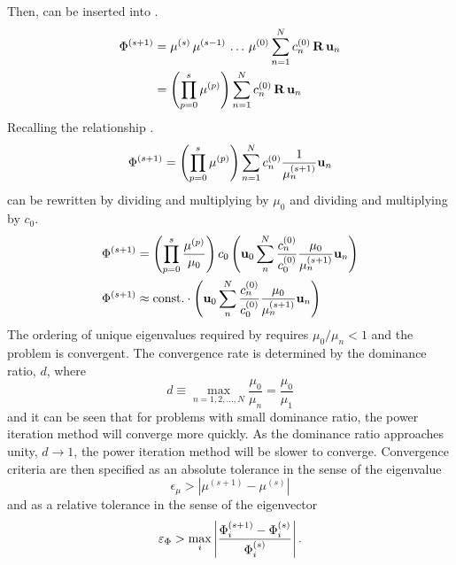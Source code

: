     Then,  can be inserted into
    .
    \begin{align}
      \Phi^{(s+1)} &= \mu^{(s)} \, \mu^{(s-1)} \, \ldots \, 
        \mu^{(0)} \sum_{n=1}^N c_n^{(0)} \, \mathbf{R} \, \mathbf{u}_n \\
      &= \left( \prod_{p=0}^{s} \mu^{(p)} \right) \sum_{n=1}^N c_n^{(0)} \, 
        \mathbf{R} \, \mathbf{u}_n
    \end{align}
    Recalling the relationship .
    \begin{equation}
      \label{eq:phi_expand_above}
      \Phi^{(s+1)} = \left( \prod_{p=0}^s \mu^{(p)} \right) 
        \sum_{n=1}^N c_n^{(0)} \frac{1}{\mu_n^{(s+1)}} \mathbf{u}_n
    \end{equation}
     can be rewritten by dividing and multiplying by
    $\mu_0$ and dividing and multiplying by $c_0$.
    \begin{align}
      \Phi^{(s+1)} &= \left( \prod_{p=0}^s \frac{\mu^{(p)}}{\mu_0} 
        \right) c_0 \left( \mathbf{u}_0 \sum_n^N \frac{c_n^{(0)}}{c_0^{(0)}}
        \frac{\mu_0}{\mu_n^{(s+1)}} \mathbf{u}_n \right) \\
      \label{eq:eigen_phi_converge}
      \Phi^{(s+1)} &\approx \text{const.} \cdot \left( 
        \mathbf{u}_0 \sum_n^N \frac{c_n^{(0)}}{c_0^{(0)}}
        \frac{\mu_0}{\mu_n^{(s+1)}} \mathbf{u}_n \right)
    \end{align}
    The ordering of unique eigenvalues required by  
    requires $\mu_0 / \mu_n < 1$ and the problem is convergent. The 
    convergence rate is determined by the dominance ratio, $d$, where
    \begin{equation}
      \label{eq:dominance_ratio}
      d \equiv \max_{n=1,2,\ldots,N} \frac{\mu_0}{\mu_n} =
        \frac{\mu_0}{\mu_1}
    \end{equation}
    and it can be seen that for problems with small dominance ratio, the power
    iteration method will converge more quickly. As the dominance ratio
    approaches unity, $d \rightarrow 1$, the power iteration method will be
    slower to converge. Convergence criteria are then specified as an absolute 
    tolerance in the sense of the eigenvalue
    \begin{equation}
      \label{eq:eigenvalue_tol}
      \epsilon_{\mu} > | \mu^{(s+1)} - \mu^{(s)} |
    \end{equation}
    and as a relative tolerance in the sense of the eigenvector
    \begin{equation}
      \label{eq:eigenvector_tol}
      \varepsilon_{\Phi} > \max_i \left| \frac{\Phi_i^{(s+1)} - \Phi_i^{(s)}}
        {\Phi_i^{(s)}}\right| .
    \end{equation}

